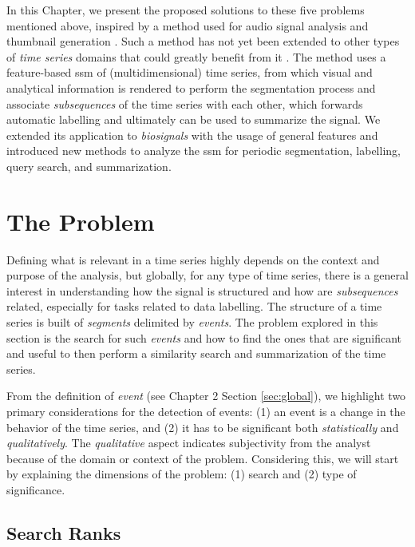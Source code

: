 In this Chapter, we present the proposed solutions to these five problems mentioned above, inspired by a method used for audio signal analysis and thumbnail generation \cite{fmp1, audiolabs1, audiolabs2, cpd_audio}. Such a method has not yet been extended to other types of \textit{time series} domains that could greatly benefit from it \cite{muller_music_health}. The method uses a feature-based \gls{ssm} of (multidimensional) time series, from which visual and analytical information is rendered to perform the segmentation process and associate \textit{subsequences} of the time series with each other, which forwards automatic labelling and ultimately can be used to summarize the signal. We extended its application to \textit{biosignals} with the usage of general features and introduced new methods to analyze the \gls{ssm} for periodic segmentation, labelling, query search, and summarization.


\section{The Problem}

Defining what is relevant in a time series highly depends on the context and purpose of the analysis, but globally, for any type of time series, there is a general interest in understanding how the signal is structured and how are \textit{subsequences} related, especially for tasks related to data labelling. The structure of a time series is built of \textit{segments} delimited by \textit{events}. The problem explored in this section is the search for such \textit{events} and how to find the ones that are significant and useful to then perform a similarity search and summarization of the time series.
\par
From the definition of \textit{event} (see Chapter 2 Section \ref{sec:global}), we highlight two primary considerations for the detection of events: (1) an event is a change in the behavior of the time series, and (2) it has to be significant both \textit{statistically} and \textit{qualitatively}. The \textit{qualitative} aspect indicates subjectivity from the analyst because of the domain or context of the problem. Considering this, we will start by explaining the dimensions of the problem: (1) search and (2) type of significance. 

\subsection{Search Ranks}

